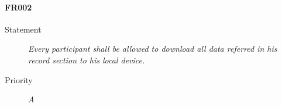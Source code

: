\paragraph{FR002}
  \begin{description}
  \item [Statement] 
    \textit{ Every participant shall be allowed to download all data referred in his record section to his local device.}
  \item [Priority] \textit{A}
\end{description}